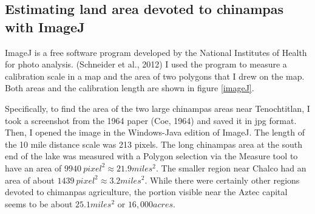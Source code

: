 \documentclass[11pt,letter]{article}
\newcommand{\bea}{\begin{eqnarray}}
\newcommand{\eea}{\end{eqnarray}}
\begin{document}
%
%
\subsection{Estimating land area devoted to chinampas with ImageJ}
\label{appx_imageJ}

ImageJ is a free software program developed by the National Institutes of Health for photo analysis. (Schneider et al., 2012)  I used the program to measure a calibration scale in a map and the area of two polygons that I drew on the map.  Both areas and the calibration length are shown in figure \ref{imageJ}.

Specifically, to find the area of the two large chinampas areas near Tenochtitlan, I took a screenshot from the 1964 paper (Coe, 1964) and saved it in jpg format.  Then, I opened the image in the Windows-Java edition of ImageJ.  The length of the 10 mile distance scale was 213 pixels. The long chinampas area at the south end of the lake was measured with a Polygon selection via the Measure tool to have an area of $9940~pixel^2\approx21.9miles^2$.  The smaller region near Chalco had an area of about $1439~pixel^2\approx3.2miles^2$.  While there were certainly other regions devoted to chimanpas agriculture, the portion visible near the Aztec capital seems to be about $25.1miles^2$ or $16,000acres$.  
\end{document}
